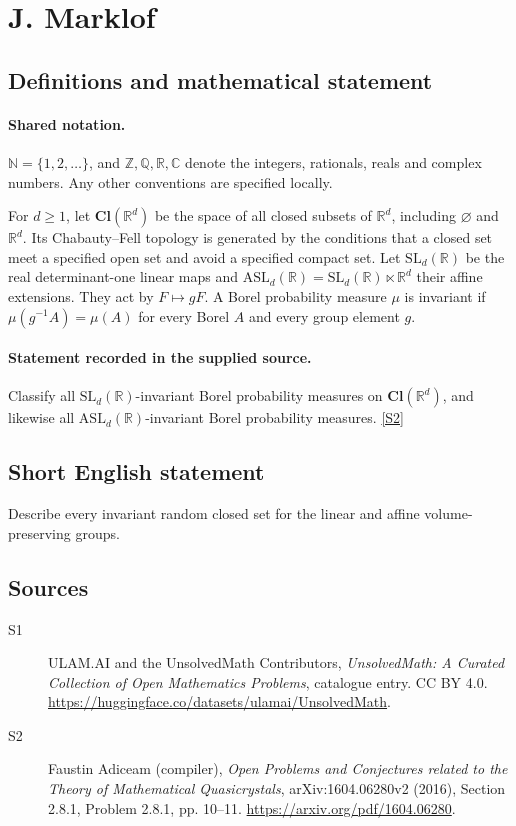\documentclass[11pt]{article}
\newcommand{\sref}[2]{\hyperlink{source:#1:#2}{[S#2]}}
\begin{document}
\section{J. Marklof}\label{statement}

\subsection{Definitions and mathematical statement}

\paragraph{Shared notation.}$\mathbb N=\{1,2,\ldots\}$, and $\mathbb Z,\mathbb Q,\mathbb R,\mathbb C$ denote the integers, rationals, reals and complex numbers. Any other conventions are specified locally.


For $d\geq1$, let $\mathbf{Cl}(\mathbb R^d)$ be the space of all closed subsets of $\mathbb R^d$, including $\varnothing$ and $\mathbb R^d$. Its Chabauty--Fell topology is generated by the conditions that a closed set meet a specified open set and avoid a specified compact set. Let $\mathrm{SL}_d(\mathbb R)$ be the real determinant-one linear maps and $\mathrm{ASL}_d(\mathbb R)=\mathrm{SL}_d(\mathbb R)\ltimes\mathbb R^d$ their affine extensions. They act by $F\mapsto gF$. A Borel probability measure $\mu$ is invariant if $\mu(g^{-1}A)=\mu(A)$ for every Borel $A$ and every group element $g$.
\paragraph{Statement recorded in the supplied source.}
Classify all $\mathrm{SL}_d(\mathbb R)$-invariant Borel probability measures on $\mathbf{Cl}(\mathbb R^d)$, and likewise all $\mathrm{ASL}_d(\mathbb R)$-invariant Borel probability measures. \sref{statement}{2}
\subsection{Short English statement}
Describe every invariant random closed set for the linear and affine volume-preserving groups.
\subsection{Sources}
\begin{description}
\item[\hypertarget{source:statement:1}{S1}] ULAM.AI and the UnsolvedMath Contributors, \emph{UnsolvedMath: A Curated Collection of Open Mathematics Problems}, catalogue entry. CC BY 4.0. \url{https://huggingface.co/datasets/ulamai/UnsolvedMath}.
\item[\hypertarget{source:statement:2}{S2}] Faustin Adiceam (compiler), \emph{Open Problems and Conjectures related to the Theory of Mathematical Quasicrystals}, arXiv:1604.06280v2 (2016), Section 2.8.1, Problem 2.8.1, pp. 10--11. \url{https://arxiv.org/pdf/1604.06280}.
\end{description}
\label{end:statement}
\end{document}

